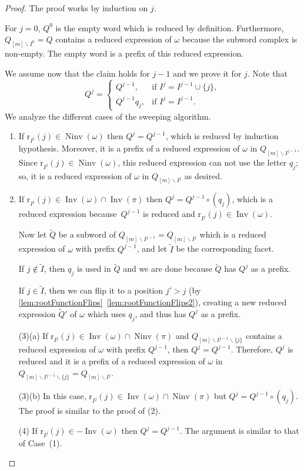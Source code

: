 \documentclass[reqno]{amsart}
\theoremstyle{definition}
\newcommand{\ssm}{\smallsetminus} %
\DeclareMathOperator{\Inv}{Inv} %
\DeclareMathOperator{\Ninv}{Ninv} %
\newcommand{\rootFunction}[2]{\mathrm{r}_{#1}(#2)} %
\begin{document}
\begin{proof}
The proof works by induction on $j$.

For $j=0$, $Q^0$ is the empty word which is reduced by definition.
Furthermore, $Q_{[m]\ssm I^0 }=Q$ contains a reduced expression of $\omega$ because the subword complex is non-empty.
The empty word is a prefix of this reduced expression. 

We assume now that the claim holds for $j-1$ and we prove it for $j$.
Note that 
\[
Q^j = 
\begin{cases}
Q^{j-1}, & \text{if } I^j=I^{j-1}\cup \{j\} ,\\
Q^{j-1} q_j, & \text{if } I^j=I^{j-1}.
\end{cases}
\]
We analyze the different cases of the sweeping algorithm.
\begin{enumerate}
    \item If $\rootFunction{I^j}{j}\in \Ninv(\omega)$ then 
    $Q^j=Q^{j-1}$, which is reduced by induction hypothesis.
    Moreover, it is a prefix of a reduced expression of $\omega$ in $Q_{[m]\ssm I^{j-1}}$.
    Since $\rootFunction{I^j}{j}\in \Ninv(\omega)$, this reduced expression can not use the letter $q_j$; so, it is a reduced expression of $\omega$ in $Q_{[m]\ssm I^{j}}$ as desired.
    \item If $\rootFunction{I^j}{j}\in \Inv(\omega) \cap \Inv(\pi)$ then $Q^j= Q^{j-1}\circ (q_j)$, which is a reduced expression because~$Q^{j-1}$ is reduced and $\rootFunction{I^j}{j}\in \Inv(\omega)$.
    
    Now let $\widetilde Q$ be a subword of $Q_{[m]\ssm I^{j-1}}=Q_{[m]\ssm I^{j}}$ which is a reduced expression of $\omega$ with prefix $Q^{j-1}$, and let $\widetilde I$ be the corresponding facet.
    
    If $j\notin \widetilde I$, then $q_j$ is used in $\widetilde Q$ and we are done because $\widetilde Q$ has $Q^j$ as a prefix.

    If $j\in \widetilde I$, then we can flip it to a position $j'>j$ (by \cref{lem:rootFunctionFlips}~\eqref{lem:rootFunctionFlips2}), creating a new reduced expression $\widetilde Q'$ of $\omega$ which uses $q_j$, and thus has $Q^j$ as a prefix.


    \item[(3)(a)] If $\rootFunction{I^j}{j}\in \Inv(\omega) \cap \Ninv(\pi)$ and $Q_{[m]\ssm I^{j-1}\ssm \{j\}}$ contains a reduced expression of $\omega$ with prefix $Q^{j-1}$, then $Q^j=Q^{j-1}$.
    Therefore, $Q^j$ is reduced and it is a prefix of a reduced expression of $\omega$ in 
    $Q_{[m]\ssm I^{j-1}\ssm \{j\}}=Q_{[m]\ssm I^j}$.

    \item[(3)(b)] In this case, $\rootFunction{I^j}{j}\in \Inv(\omega) \cap \Ninv(\pi)$ but $Q^j= Q^{j-1}\circ (q_j)$. The proof is similar to the proof of (2).

    \item[(4)] If $\rootFunction{I^j}{j}\in -\Inv(\omega)$ then $Q^j=Q^{j-1}$. The argument is similar to that of Case~(1).
    \qedhere
    \end{enumerate}
\end{proof}
\end{document}
